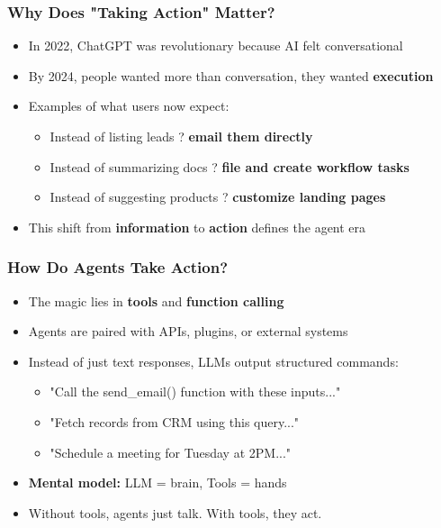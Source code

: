 \begin{frame}[fragile]\frametitle{Why Does "Taking Action" Matter?}
\begin{itemize}
    \item In 2022, ChatGPT was revolutionary because AI felt conversational
    \item By 2024, people wanted more than conversation, they wanted \textbf{execution}
    \item Examples of what users now expect:
    \begin{itemize}
        \item Instead of listing leads ? \textbf{email them directly}
        \item Instead of summarizing docs ? \textbf{file and create workflow tasks}
        \item Instead of suggesting products ? \textbf{customize landing pages}
    \end{itemize}
    \item This shift from \textbf{information} to \textbf{action} defines the agent era
\end{itemize}
\end{frame}

\begin{frame}[fragile]\frametitle{How Do Agents Take Action?}
\begin{itemize}
    \item The magic lies in \textbf{tools} and \textbf{function calling}
    \item Agents are paired with APIs, plugins, or external systems
    \item Instead of just text responses, LLMs output structured commands:
    \begin{itemize}
        \item "Call the send\_email() function with these inputs..."
        \item "Fetch records from CRM using this query..."
        \item "Schedule a meeting for Tuesday at 2PM..."
    \end{itemize}
    \item \textbf{Mental model:} LLM = brain, Tools = hands
    \item Without tools, agents just talk. With tools, they act.
\end{itemize}
\end{frame}


